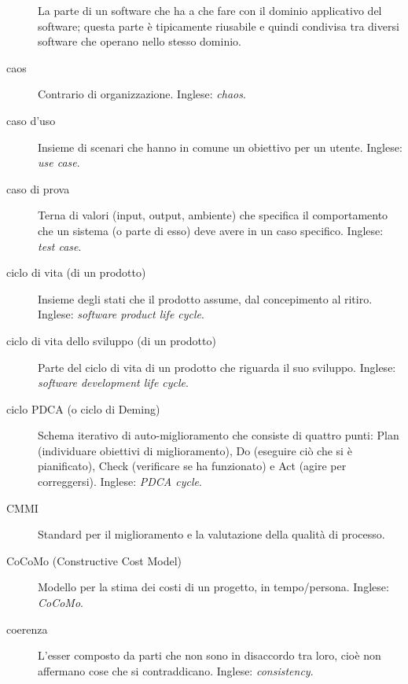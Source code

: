 \documentclass[a4paper]{article}
\begin{document}
\begin{description}
			La parte di un software che ha a che fare con il dominio applicativo del software; questa parte è tipicamente riusabile e quindi condivisa tra diversi software che operano nello stesso dominio.
			
	\item[caos] 

			Contrario di organizzazione. Inglese: \emph{chaos}.
			
	\item[caso d'uso] 

			Insieme di scenari che hanno in comune un obiettivo per un utente. Inglese: \emph{use case}.
			
	\item[caso di prova] 

			Terna di valori (input, output, ambiente) che specifica il comportamento che un sistema (o parte di esso) deve avere in un caso specifico. Inglese: \emph{test case}.
			
	\item[ciclo di vita (di un prodotto)] 

			Insieme degli stati che il prodotto assume, dal concepimento al ritiro. Inglese: \emph{software product life cycle}.
			
	\item[ciclo di vita dello sviluppo (di un prodotto)] 

			Parte del ciclo di vita di un prodotto che riguarda il suo sviluppo. Inglese: \emph{software development life cycle}.
			
	\item[ciclo PDCA (o ciclo di Deming)] 

			Schema iterativo di auto-miglioramento che consiste di quattro punti: Plan (individuare obiettivi di miglioramento), Do (eseguire ciò che si è pianificato), Check (verificare se ha funzionato) e Act (agire per correggersi). Inglese: \emph{PDCA cycle}.
			
	\item[CMMI] 

			Standard per il miglioramento e la valutazione della qualità di processo.
			
	\item[CoCoMo (Constructive Cost Model)] 

			Modello per la stima dei costi di un progetto, in tempo/persona. Inglese: \emph{CoCoMo}.
			
	\item[coerenza] 

			L'esser composto da parti che non sono in disaccordo tra loro, cioè non affermano cose che si contraddicano. Inglese: \emph{consistency}.
			

\end{description}
\end{document}
